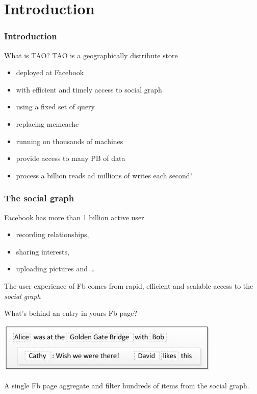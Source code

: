 
\setlength{\parskip}{\baselineskip} 
\section*{Introduction}
\begin{frame}[t]
\frametitle{Introduction}
\begin{block}{What is TAO?}
	TAO is a geographically distribute store
	\begin{itemize}
		\item deployed at Facebook
	 	\item with efficient and timely access to social graph
	 	\item using a fixed set of query
	 	\item replacing memcache
	 	\item running on thousands of machines
	 	\item provide access to many PB of data
	 	\item process a billion reads ad millions of writes each second!
	 \end{itemize} 
\end{block}
\end{frame}

\begin{frame}
\frametitle{The social graph}
Facebook has more than 1 billion active user 
\begin{itemize}
	\item recording relationships,
	\item sharing interests,
	\item uploading pictures and \dots
\end{itemize}

The user experience of Fb comes from rapid, efficient and scalable access to the \emph{social graph}
\end{frame}

\begin{frame}
	What's behind an entry in yours Fb page?

	\begin{center}
	\includegraphics[width=0.8\textwidth]{figs/social.jpg}	\\
	\end{center}
	A single Fb page aggregate and filter hundreds of items from the social graph.
\end{frame}%

